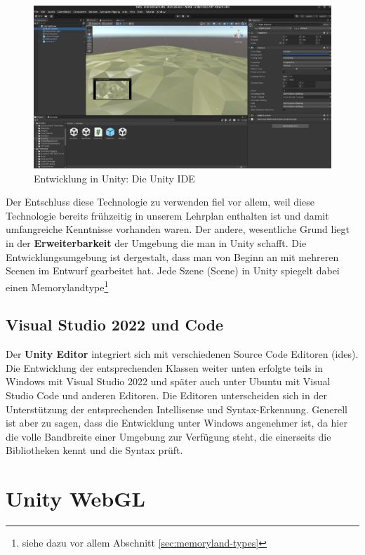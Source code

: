 \begin{figure} [h t]
    \centering
    \includegraphics[scale=0.1]{pics/unity-ide.png}
    \caption{Entwicklung in Unity: Die Unity IDE}
    \label{fig:unity-ide}
\end{figure}



Der Entschluss diese Technologie zu verwenden fiel vor allem, weil diese Technologie bereits frühzeitig in unserem Lehrplan enthalten ist und damit umfangreiche Kenntnisse vorhanden waren. Der andere, wesentliche Grund liegt in der \textbf{Erweiterbarkeit} der Umgebung die man in Unity schafft. Die Entwicklungsumgebung ist dergestalt, dass man von Beginn an mit mehreren Scenen im Entwurf gearbeitet hat. Jede Szene (Scene) in Unity spiegelt dabei einen Memorylandtype\footnote{siehe dazu vor allem Abschnitt \ref{sec:memoryland-types}}



\subsection{Visual Studio 2022 und Code}

Der \textbf{Unity Editor} integriert sich mit verschiedenen Source Code Editoren (\Glspl{ide}). Die Entwicklung der entsprechenden Klassen weiter unten erfolgte teils in Windows mit Visual Studio 2022 und später auch unter Ubuntu mit Visual Studio Code und anderen Editoren. Die Editoren unterscheiden sich in der Unterstützung der entsprechenden Intellisense und Syntax-Erkennung. Generell ist aber zu sagen, dass die Entwicklung unter Windows angenehmer ist, da hier die volle Bandbreite einer Umgebung zur Verfügung steht, die einerseits die Bibliotheken kennt und die Syntax prüft.



\section{Unity WebGL}
\label{sec:unity-webgl}

